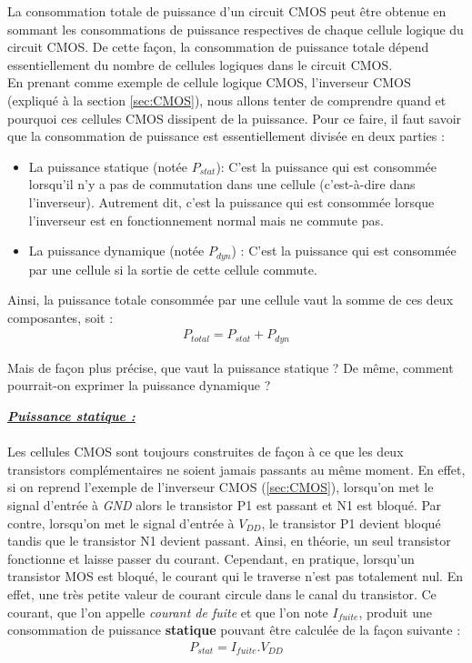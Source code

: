 \documentclass[10pt, oneside, a4paper]{article}
\begin{document}
La consommation totale de puissance d'un circuit CMOS peut être obtenue en sommant les consommations de puissance respectives de chaque cellule logique du circuit CMOS. De cette façon, la consommation de puissance totale dépend essentiellement du nombre de cellules logiques dans le circuit CMOS. \\
En prenant comme exemple de cellule logique CMOS, l'inverseur CMOS (expliqué à la section \ref{sec:CMOS}), nous allons tenter de comprendre quand et pourquoi ces cellules CMOS dissipent de la puissance. Pour ce faire, il faut savoir que la consommation de puissance est essentiellement divisée en deux parties : 
\begin{itemize}
\item La puissance statique (notée $P_{stat}$): C'est la puissance qui est consommée lorsqu'il n'y a pas de commutation dans une cellule (c'est-à-dire dans l'inverseur). Autrement dit, c'est la puissance qui est consommée lorsque l'inverseur est en fonctionnement normal mais ne commute pas.
\item La puissance dynamique (notée $P_{dyn}$) : C'est la puissance qui est consommée par une cellule si la sortie de cette cellule commute. 
\end{itemize}
Ainsi, la puissance totale consommée par une cellule vaut la somme de ces deux composantes, soit :
\begin{gather}
	P_{total} = P_{stat} + P_{dyn}
\end{gather}

Mais de façon plus précise, que vaut la puissance statique ? De même, comment pourrait-on exprimer la puissance dynamique ? 

\underline{\textbf{\textit{Puissance statique :}}} \\ \\
Les cellules CMOS sont toujours construites de façon à ce que les deux transistors complémentaires ne soient jamais passants au même moment. En effet, si on reprend l'exemple de l'inverseur CMOS (\ref{sec:CMOS}), lorsqu'on met le signal d'entrée à \textit{GND} alors le transistor P1 est passant et N1 est bloqué. Par contre, lorsqu'on met le signal d'entrée à \textit{$V_{DD}$}, le transistor P1 devient bloqué tandis que le transistor N1 devient passant. Ainsi, en théorie, un seul transistor fonctionne et laisse passer du courant. Cependant, en pratique, lorsqu'un transistor MOS est bloqué, le courant qui le traverse n'est pas totalement nul. En effet, une très petite valeur de courant circule dans le canal du transistor. Ce courant, que l'on appelle \textit{courant de fuite} et que l'on note \textit{$I_{fuite}$}, produit une consommation de puissance \textbf{statique} pouvant être calculée de la façon suivante :
\begin{gather}
	P_{stat} = I_{fuite} . V_{DD}
\end{gather}
\end{document}

